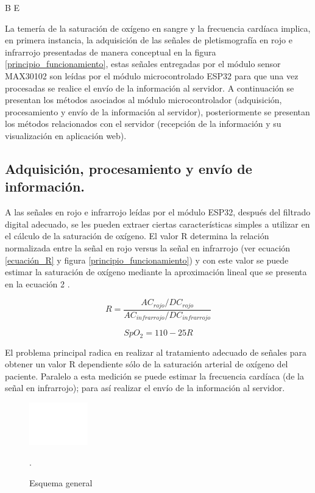 \documentclass[journal]{IEEEtran}
\begin{document}
{\color{blue}B E}


La temería de la saturación de oxígeno en sangre y la frecuencia cardíaca implica, en primera instancia, la adquisición de las señales de pletismografía en rojo e infrarrojo presentadas de manera conceptual en la figura \ref{principio_funcionamiento}, estas señales entregadas por el módulo sensor MAX30102 son leídas por el módulo microcontrolado ESP32 para que una vez procesadas se realice el envío de la información al servidor. A continuación se presentan los métodos asociados al módulo microcontrolador (adquisición, procesamiento y envío de la información al servidor), posteriormente se presentan los métodos relacionados con el servidor (recepción de la información y su visualización en aplicación web).

\subsection{Adquisición, procesamiento y envío de información.}
A las señales en rojo e infrarrojo leídas por el módulo ESP32, después del filtrado digital adecuado, se les pueden extraer ciertas características simples a utilizar en el cálculo de la saturación de oxígeno. El valor R determina la relación normalizada entre la señal en rojo versus la señal en infrarrojo (ver ecuación \ref{ecuación_R} y figura \ref{principio_funcionamiento}) y con este valor se puede estimar la saturación de oxígeno mediante la aproximación lineal que se presenta en la ecuación 2 \cite{E_FFT_Spo2}. 

\begin{equation}
	R=\frac{AC_{rojo}/DC_{rojo}}{AC_{infrarrojo}/DC_{infrarrojo}}
	\label{ecuación_R}
\end{equation}

\begin{equation}
	SpO_2 = 110-25R
	\label{ecuación_SpO2}
\end{equation}


El problema principal radica en realizar al tratamiento adecuado de señales para obtener un valor R dependiente sólo de la saturación arterial de oxígeno del paciente. Paralelo a esta medición se puede estimar la frecuencia cardíaca (de la señal en infrarrojo); para así realizar el envío de la información al servidor. 



\begin{figure}[!h]
	\centering
	\includegraphics[width=1in]{Esquema general.png}
	\caption{Esquema general}.
	\label{estructura_general}
\end{figure}
\end{document}
